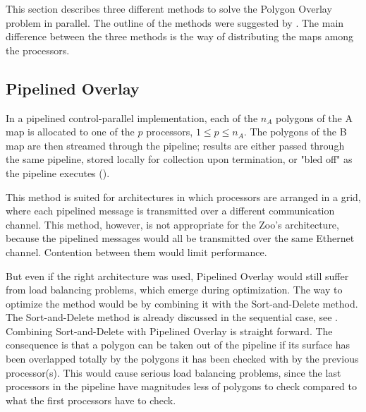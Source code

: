 
This section describes three different methods to solve the
Polygon Overlay problem in parallel. 
The outline of the methods were suggested by \cite{Wilson:1994}.
The main difference between the three methods is the way of
distributing the maps among the processors.



\subsection{Pipelined Overlay}

In a pipelined control-parallel implementation,
each of the $n_A$ polygons of the A map is allocated to one
of the $p$ processors, $1 \leq p \leq n_A$.
The polygons of the B map are then streamed through the
pipeline;
results are either passed through the same pipeline,
stored locally for collection upon termination,
or "bled off" as the pipeline executes
().

\begin{figure}[hbtp]
  \begin{centering}
    \hspace{0cm}
  \end{centering}
\end{figure}

This method is suited for architectures in which
processors are arranged in a grid, where each pipelined message
is transmitted over a different communication channel.
This method, however, is not appropriate for the Zoo's architecture,
because the pipelined messages would all be transmitted over
the same Ethernet channel.
Contention between them would limit performance.

But even if the right architecture was used, 
Pipelined Overlay would still suffer from load balancing
problems, which emerge during optimization.
The way to optimize the method would be by combining it with
the Sort-and-Delete method.
The Sort-and-Delete method is already discussed in the sequential
case, see
.
Combining Sort-and-Delete with Pipelined Overlay is straight
forward.
The consequence is that a polygon can be taken out of the pipeline if
its surface has been overlapped totally by the polygons it has
been checked with by the previous processor(s).
This would cause serious load balancing problems, since the last
processors in the pipeline have magnitudes less of polygons to check
compared to what the first processors have to check.




